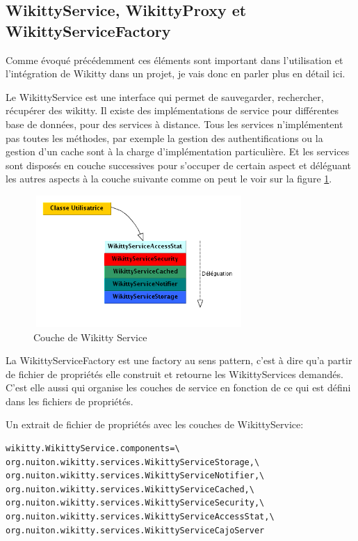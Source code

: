 \subsection{WikittyService, WikittyProxy et WikittyServiceFactory}

Comme évoqué précédemment ces éléments sont important dans l'utilisation et 
l'intégration de Wikitty dans un projet, je vais donc en parler plus en détail
ici.

Le WikittyService est une interface qui permet de sauvegarder, rechercher,
récupérer des wikitty. Il existe des implémentations de service pour différentes
base de données, pour des services à distance. Tous les services n'implémentent 
pas toutes les méthodes, par exemple la gestion des authentifications ou la 
gestion d'un cache sont à la charge d'implémentation particulière. Et les
services sont disposés en couche successives pour s'occuper de certain aspect
et déléguant les autres aspects à la couche suivante comme on peut le voir sur 
la figure \ref{pileService}.

\begin{figure}[!ht]
\centering
\includegraphics[height=5cm,width=8cm]{image/pileService.png}
  		\caption{Couche de Wikitty Service}
  		\label{pileService}
\end{figure}

La WikittyServiceFactory est une factory au sens pattern, c'est à dire qu'a 
partir de fichier de propriétés elle construit et retourne les WikittyServices 
demandés. C'est elle aussi qui organise les couches de service en fonction de ce 
qui est défini dans les fichiers de propriétés.


Un extrait de fichier de propriétés avec les couches de WikittyService:
\begin{verbatim}
wikitty.WikittyService.components=\
org.nuiton.wikitty.services.WikittyServiceStorage,\
org.nuiton.wikitty.services.WikittyServiceNotifier,\
org.nuiton.wikitty.services.WikittyServiceCached,\
org.nuiton.wikitty.services.WikittyServiceSecurity,\
org.nuiton.wikitty.services.WikittyServiceAccessStat,\
org.nuiton.wikitty.services.WikittyServiceCajoServer
\end{verbatim}

